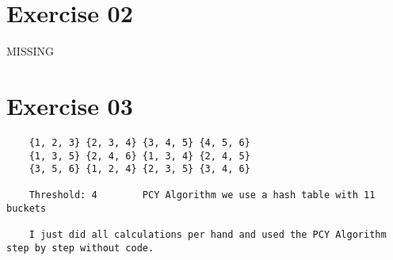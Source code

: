 \documentclass[11pt,a4paper]{scrartcl}
\begin{document}
\section*{Exercise 02}
MISSING

\section*{Exercise 03}
	\begin{verbatim}
	{1, 2, 3} {2, 3, 4} {3, 4, 5} {4, 5, 6}
	{1, 3, 5} {2, 4, 6} {1, 3, 4} {2, 4, 5}
	{3, 5, 6} {1, 2, 4} {2, 3, 5} {3, 4, 6}
	
	Threshold: 4		PCY Algorithm we use a hash table with 11 buckets
	
  	I just did all calculations per hand and used the PCY Algorithm step by step without code.
	\end{verbatim}
\end{document}
